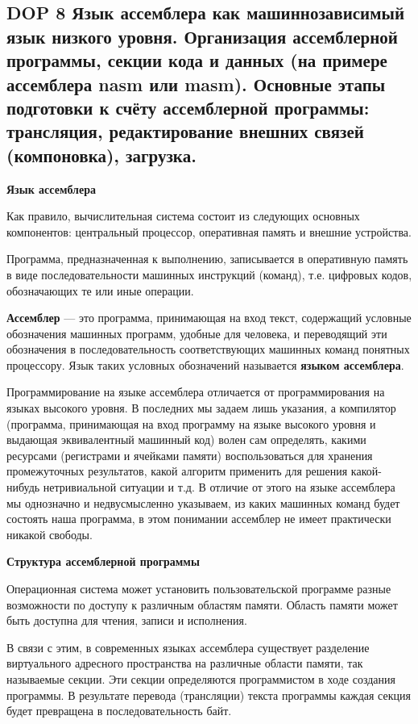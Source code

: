 \subsection{DOP 8 Язык  ассемблера  как  машиннозависимый  язык  низкого  уровня.  Организация  ассемблерной  программы, секции кода и данных (на примере ассемблера nasm или masm). Основные  этапы подготовки к счёту ассемблерной программы: трансляция, редактирование внешних связей (компоновка), загрузка.}

\textbf{Язык ассемблера}

Как правило, вычислительная система состоит из следующих основных компонентов: центральный процессор, оперативная память и внешние устройства.

Программа, предназначенная к выполнению, записывается в оперативную память в виде последовательности машинных инструкций (команд), т.е. цифровых кодов, обозначающих те или иные операции.

\textbf{Ассемблер} --- это программа, принимающая на вход текст, содержащий условные обозначения машинных программ, удобные для человека, и переводящий эти обозначения в последовательность соответствующих машинных команд понятных процессору.
Язык таких условных обозначений называется \textbf{языком ассемблера}.

Программирование на языке ассемблера отличается от программирования на языках высокого уровня.
В последних мы задаем лишь указания, а компилятор (программа, принимающая на вход программу на языке высокого уровня и выдающая эквивалентный машинный код) волен сам определять, какими ресурсами (регистрами и ячейками памяти) воспользоваться для хранения промежуточных результатов, какой алгоритм применить для решения какой-нибудь нетривиальной ситуации и т.д.
В отличие от этого на языке ассемблера мы однозначно и недвусмысленно указываем, из каких машинных команд будет состоять наша программа, в этом понимании ассемблер не имеет практически никакой свободы.

\textbf{Структура ассемблерной программы}

Операционная система может установить пользовательской программе разные возможности по доступу к различным областям памяти. Область памяти может быть доступна для чтения, записи и исполнения.

В связи с этим, в современных языках ассемблера существует разделение виртуального адресного пространства на различные области памяти, так называемые секции.
Эти секции определяются программистом в ходе создания программы.
В результате перевода (трансляции) текста программы каждая секция будет превращена в последовательность байт.

